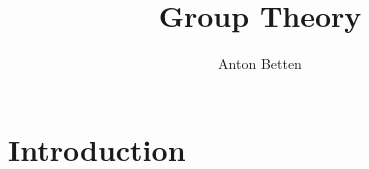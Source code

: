 \documentclass[10pt]{book}
\title{Group Theory}
\author{Anton Betten}
\newcommand\setTBstruts{\def\T{\rule{0pt}{2.6ex}}%
\def\B{\rule[-1.2ex]{0pt}{0pt}}}
\begin{document}

\setTBstruts


\maketitle





\chapter{Introduction}
\label{chapter:introduction}








%








\end{document}
